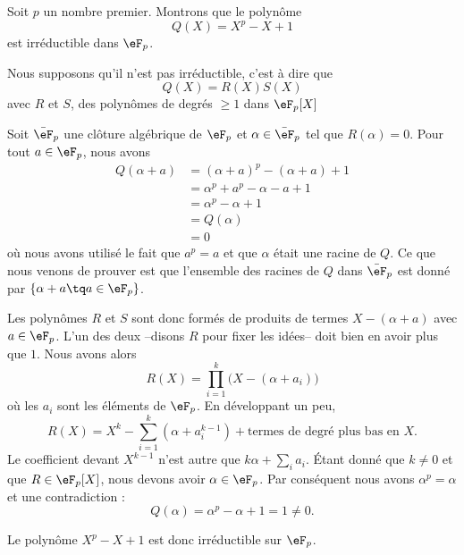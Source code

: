 \begin{example}     \label{ExfUqQXQ}
    Soit \( p\) un nombre premier. Montrons que le polynôme 
    \begin{equation}
        Q(X)=X^p-X+1
    \end{equation}
    est irréductible dans \( \eF_p\). 

    Nous supposons qu'il n'est pas irréductible, c'est à dire que
    \begin{equation}
        Q(X)=R(X)S(X)
    \end{equation}
    avec \( R\) et \( S\), des polynômes de degrés \( \geq 1\) dans \( \eF_p[X]\)

    Soit \( \bar\eF_p\) une clôture algébrique de \( \eF_p\) et \( \alpha\in \bar \eF_p\) tel que \( R(\alpha)=0\). Pour tout \( a\in \eF_p\), nous avons
    \begin{subequations}
        \begin{align}
            Q(\alpha+a)&=(\alpha+a)^p-(\alpha+a)+1\\
            &=\alpha^p+a^p-\alpha-a+1\\
            &=\alpha^p-\alpha+1\\
            &=Q(\alpha)\\
            &=0
        \end{align}
    \end{subequations}
    où nous avons utilisé le fait que \( a^p=a\) et que \( \alpha\) était une racine de \( Q\). Ce que nous venons de prouver est que l'ensemble des racines de \( Q\) dans \( \bar\eF_p\) est donné par \( \{ \alpha+a\tq a\in \eF_p \}\).

    Les polynômes \( R\) et \( S\) sont donc formés de produits de termes \( X-(\alpha+a)\) avec \( a\in \eF_p\). L'un des deux --disons \( R\) pour fixer les idées-- doit bien en avoir plus que \( 1\). Nous avons alors
    \begin{equation}
        R(X)=\prod_{i=1}^{k}\big( X-(\alpha+a_i) \big)
    \end{equation}
    où les \( a_i\) sont les éléments de \( \eF_p\). En développant un peu,
    \begin{equation}
        R(X)=X^k-\sum_{i=1}^k(\alpha+a_i^{k-1})+\text{termes de degré plus bas en } X.
    \end{equation}
    Le coefficient devant \( X^{k-1}\) n'est autre que \( k\alpha+\sum_ia_i\). Étant donné que \( k\neq 0\) et que \( R\in \eF_p[X]\), nous devons avoir \( \alpha\in \eF_p\). Par conséquent nous avons \( \alpha^p=\alpha\) et une contradiction :
    \begin{equation}
        Q(\alpha)=\alpha^p-\alpha+1=1\neq 0.
    \end{equation}

    Le polynôme \( X^p-X+1\) est donc irréductible sur \( \eF_p\).
\end{example}

